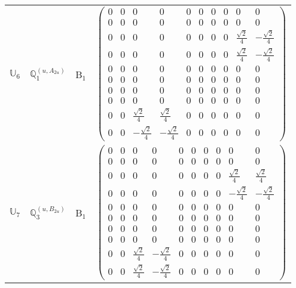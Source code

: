 \documentclass[fleqn,10pt,landscape]{article}
\begin{document}
\begin{itemize}
\begin{center}
\begin{longtable}{c|c|c|c}
$ \mathbb{U}_{6} $ & $\mathbb{Q}_{1}^{(u,A_{2u})}$ & B$_{1}$ & $\begin{pmatrix} 0 & 0 & 0 & 0 & 0 & 0 & 0 & 0 & 0 & 0 \\ 0 & 0 & 0 & 0 & 0 & 0 & 0 & 0 & 0 & 0 \\ 0 & 0 & 0 & 0 & 0 & 0 & 0 & 0 & \frac{\sqrt{2}}{4} & - \frac{\sqrt{2}}{4} \\ 0 & 0 & 0 & 0 & 0 & 0 & 0 & 0 & \frac{\sqrt{2}}{4} & - \frac{\sqrt{2}}{4} \\ 0 & 0 & 0 & 0 & 0 & 0 & 0 & 0 & 0 & 0 \\ 0 & 0 & 0 & 0 & 0 & 0 & 0 & 0 & 0 & 0 \\ 0 & 0 & 0 & 0 & 0 & 0 & 0 & 0 & 0 & 0 \\ 0 & 0 & 0 & 0 & 0 & 0 & 0 & 0 & 0 & 0 \\ 0 & 0 & \frac{\sqrt{2}}{4} & \frac{\sqrt{2}}{4} & 0 & 0 & 0 & 0 & 0 & 0 \\ 0 & 0 & - \frac{\sqrt{2}}{4} & - \frac{\sqrt{2}}{4} & 0 & 0 & 0 & 0 & 0 & 0 \end{pmatrix}$ \\
$ \mathbb{U}_{7} $ & $\mathbb{Q}_{3}^{(u,B_{2u})}$ & B$_{1}$ & $\begin{pmatrix} 0 & 0 & 0 & 0 & 0 & 0 & 0 & 0 & 0 & 0 \\ 0 & 0 & 0 & 0 & 0 & 0 & 0 & 0 & 0 & 0 \\ 0 & 0 & 0 & 0 & 0 & 0 & 0 & 0 & \frac{\sqrt{2}}{4} & \frac{\sqrt{2}}{4} \\ 0 & 0 & 0 & 0 & 0 & 0 & 0 & 0 & - \frac{\sqrt{2}}{4} & - \frac{\sqrt{2}}{4} \\ 0 & 0 & 0 & 0 & 0 & 0 & 0 & 0 & 0 & 0 \\ 0 & 0 & 0 & 0 & 0 & 0 & 0 & 0 & 0 & 0 \\ 0 & 0 & 0 & 0 & 0 & 0 & 0 & 0 & 0 & 0 \\ 0 & 0 & 0 & 0 & 0 & 0 & 0 & 0 & 0 & 0 \\ 0 & 0 & \frac{\sqrt{2}}{4} & - \frac{\sqrt{2}}{4} & 0 & 0 & 0 & 0 & 0 & 0 \\ 0 & 0 & \frac{\sqrt{2}}{4} & - \frac{\sqrt{2}}{4} & 0 & 0 & 0 & 0 & 0 & 0 \end{pmatrix}$ \\

\end{longtable}
\end{center}
\end{itemize}
\end{document}
